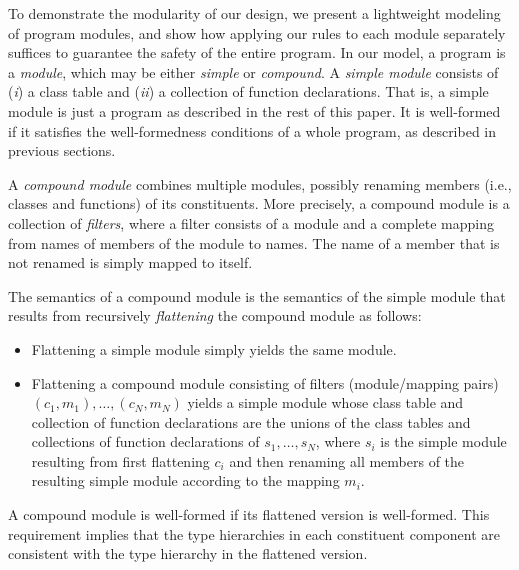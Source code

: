 \documentclass[10pt]{sigplanconf}
\begin{document}


To demonstrate the modularity of our design,
we present a lightweight modeling of program modules,
and show how applying our rules to each module separately
suffices to guarantee the safety of the entire program.
In our model, 
a program is a \emph{module}, which may be either \emph{simple} or \emph{compound}.
A \emph{simple module} consists of 
(\emph{i}) a class table and 
(\emph{ii}) a collection of function declarations.
That is, a simple module is just a program as described in the rest of this paper.
It is well-formed if it satisfies the well-formedness conditions of a whole program,
as described in previous sections.

A \emph{compound module} combines multiple modules, 
possibly renaming members (i.e., classes and functions) of its constituents.
More precisely, a compound module is a collection of \emph{filters},
where a filter consists of a module 
and a complete mapping from names of members of the module to names.
The name of a member that is not renamed is simply mapped to itself.

The semantics of a compound module is the semantics of the simple module
that results from recursively \emph{flattening} the compound module as follows:
\begin{itemize}

\item
Flattening a simple module simply yields the same module.

\item Flattening a compound module 
consisting of filters (module/mapping pairs) $(c_1, m_1), \ldots, (c_N, m_N)$
yields a simple module whose class table and collection of function declarations
are the unions of the class tables and collections of function declarations
of $s_1, \ldots, s_N$, where $s_i$ is the simple module resulting from
first flattening $c_i$ and then renaming all members
of the resulting simple module according to the mapping $m_i$.

\end{itemize}
A compound module is well-formed if its flattened version is well-formed.
This requirement implies that the type hierarchies in each constituent component 
are consistent with the type hierarchy in the flattened version.
\end{document}
